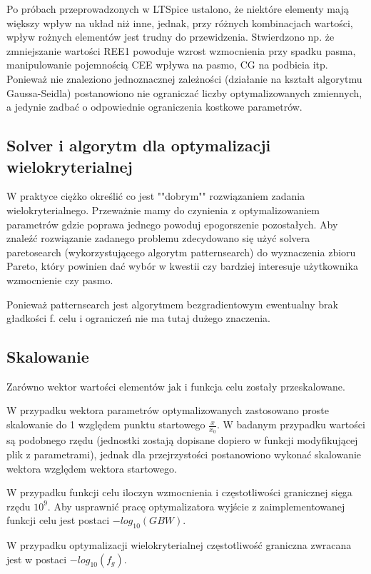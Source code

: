 \documentclass{article}
\begin{document}
Po próbach przeprowadzonych w LTSpice ustalono, że niektóre elementy mają większy wpływ na układ niż inne, jednak, przy różnych kombinacjach wartości, wpływ rożnych elementów jest trudny do przewidzenia.
Stwierdzono np. że zmniejszanie wartości REE1 powoduje wzrost wzmocnienia przy spadku pasma, manipulowanie pojemnością CEE wpływa na pasmo, CG na podbicia itp.
Ponieważ nie znaleziono jednoznacznej zależności (działanie na kształt algorytmu Gaussa-Seidla) postanowiono nie ograniczać liczby optymalizowanych zmiennych, a jedynie zadbać o odpowiednie
ograniczenia kostkowe parametrów.
\subsection*{Solver i algorytm dla optymalizacji wielokryterialnej}
W praktyce ciężko określić co jest ""dobrym"" rozwiązaniem zadania wielokryterialnego. Przeważnie mamy do czynienia z optymalizowaniem parametrów gdzie poprawa jednego powoduj epogorszenie pozostałych.
Aby znaleźć rozwiązanie zadanego problemu zdecydowano się użyć solvera paretosearch (wykorzystującego algorytm patternsearch) do wyznaczenia zbioru Pareto, który powinien dać wybór w kwestii czy bardziej interesuje użytkownika
wzmocnienie czy pasmo. 

Ponieważ patternsearch jest algorytmem bezgradientowym ewentualny brak gładkości f. celu i ograniczeń nie ma tutaj dużego znaczenia.
\subsection*{Skalowanie}
Zarówno wektor wartości elementów jak i funkcja celu zostały przeskalowane.

W przypadku wektora parametrów optymalizowanych zastosowano proste skalowanie do 1 względem punktu startowego $\frac{x}{x_0}$.
W badanym przypadku wartości są podobnego rzędu (jednostki zostają dopisane dopiero w funkcji modyfikującej plik z parametrami), jednak dla przejrzystości postanowiono wykonać
skalowanie wektora względem wektora startowego.

W przypadku funkcji celu iloczyn wzmocnienia i częstotliwości granicznej sięga rzędu $10^9$.
Aby usprawnić pracę optymalizatora wyjście z zaimplementowanej funkcji celu jest postaci $-log_{10}(GBW)$.

W przypadku optymalizacji wielokryterialnej częstotliwość graniczna zwracana jest w postaci $-log_{10}(f_g)$.


\end{document}

